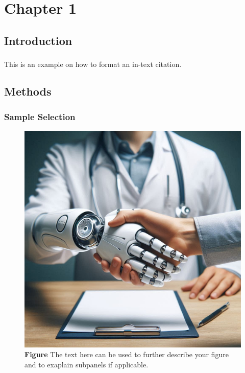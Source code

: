 \chapter{Chapter 1}

\section{Introduction}

This is an example on how to format an in-text citation. \textsuperscript{\cite{Balzano2022,Yao2014}} 

\section{Methods}
\subsection{Sample Selection}







 



\begin{figure}[htbp] 
    \centering 
    \includegraphics[scale=0.3]{figures/paper1/example_figure.jpeg} %
    \caption[This will be in the list of figures]{\textbf{Figure \thefigure} The text here can be used to further describe your figure and to exaplain subpanels if applicable.}
    \label{fig:figure_label_later_reference}
\end{figure}


 
